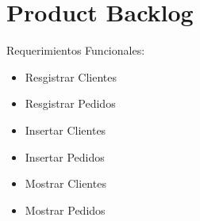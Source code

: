 \chapter{Product Backlog}

Requerimientos Funcionales:
\begin{itemize}
	\item Resgistrar Clientes
	\item Resgistrar Pedidos
	\item Insertar Clientes
	\item Insertar Pedidos
	\item Mostrar Clientes
	\item Mostrar Pedidos
\end{itemize}
